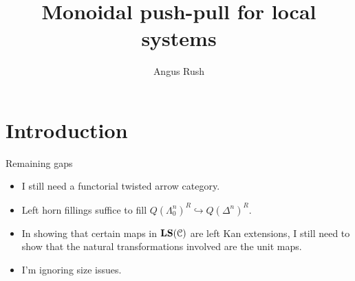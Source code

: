 \documentclass[a4paper,12pt]{scrartcl}
\title{Monoidal push-pull for local systems}
\author{Angus Rush}
\begin{document}
\maketitle 
\tableofcontents

\section{Introduction}
\label{sec:introduction}

Remaining gaps

\begin{itemize}
  \item I still need a functorial twisted arrow category.

  \item Left horn fillings suffice to fill $Q(\Lambda^{n}_{0})^{R} \hookrightarrow Q(\Delta^{n})^{R}$.

  \item In showing that certain maps in $\mathbf{LS}(\mathcal{C})$ are left Kan extensions, I still need to show that the natural transformations involved are the unit maps.

  \item I'm ignoring size issues.
\end{itemize}

%






\end{document}
